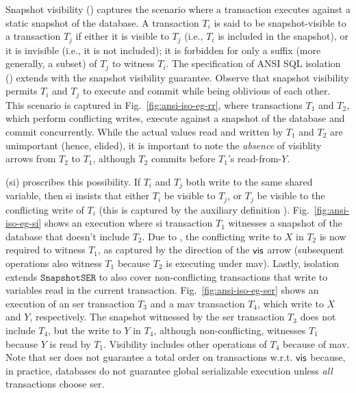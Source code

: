 Snapshot visibility () captures the scenario where a
transaction executes against a static snapshot of the database.  A
transaction $T_i$ is said to be snapshot-visible to a transaction
$T_j$ if either it is visible to $T_j$ (i.e., $T_i$ is included in the
snapshot), or it is invisible (i.e., it is not included); it is
forbidden for only a suffix (more generally, a subset) of $T_j$ to
witness $T_i$. The specification of ANSI SQL 
isolation () extends  with the snapshot visibility
guarantee.  Observe that snapshot visibility permits $T_i$ and $T_j$
to execute and commit while being oblivious of each other. This
scenario is captured in Fig.~\ref{fig:ansi-iso-eg-rr}, where
transactions $T_1$ and $T_2$, which perform conflicting writes,
execute against a snapshot of the database and commit concurrently.
While the actual values read and written by $T_1$ and $T_2$ are
unimportant (hence, elided), it is important to note the
\emph{absence} of visiblity arrows from $T_2$ to $T_1$, although $T_2$
commits before $T_1$'s read-from-$Y$.

 ({\sc si}) proscribes this possibility. If
$T_i$ and $T_j$ both write to the same shared variable, then {\sc si}
insists that either $T_i$ be visible to $T_j$, or $T_j$ be visible to
the conflicting write of $T_i$ (this is captured by the auxiliary
definition ). Fig.~\ref{fig:ansi-iso-eg-si} shows an
execution where {\sc si} transaction $T_1$ witnesses a snapshot of the
database that doesn't include $T_2$. Due to , the
conflicting write to $X$ in $T_2$ is now required to witness $T_1$, as
captured by the direction of the $\textsf{vis}$ arrow (subsequent operations
also witness $T_1$ because $T_2$ is executing under {\sc mav}).
Lastly,  isolation extends $\mathtt{SnapshotSER}$ to
also cover non-conflicting transactions that write to variables read
in the current transaction.  Fig.~\ref{fig:ansi-iso-eg-ser} shows an
execution of an {\sc ser} transaction $T_3$ and a {\sc mav}
transaction $T_4$, which write to $X$ and $Y$, respectively. The
snapshot witnessed by the {\sc ser} transaction $T_3$ does not include
$T_4$, but the write to $Y$ in $T_4$, although non-conflicting,
witnesses $T_1$ because $Y$ is read by $T_1$. Visibility includes
other operations of $T_4$ because of {\sc mav}. Note that {\sc ser}
does not guarantee a total order on transactions w.r.t. $\textsf{vis}$
because, in practice, databases do not guarantee global serializable
execution unless \emph{all} transactions choose {\sc ser}.

